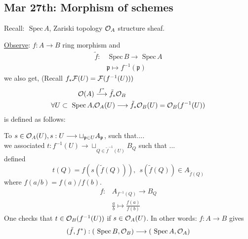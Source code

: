\documentclass[11pt]{article}
\theoremstyle{definition}
\newcommand{\spec}{\text{ Spec}\,}
\newcommand{\scp}{{\mathfrak p}}
\newcommand{\calf}{{\cal F}}
\newcommand{\calo}{{\cal O}}
\newcommand{\lrta}{\longrightarrow}
\begin{document}
\subsection{Mar 27th: Morphism of schemes}
Recall: $\spec A$, Zariski topology $\calo_A$ structure sheaf.

\underline{Observe}: 
$f:A\lrta B$ ring morphism and 
$$
\begin{aligned}
\tilde{f}:&\spec B\lrta \spec A\\
& \scp\longmapsto f^{-1}(\scp)
\end{aligned}
$$
we also get, (Recall $f_*\calf(U)=\calf(f^{-1}(U)))$
$$
\begin{aligned}
\calo(A) &\overset{f^*}{\lrta}  \tilde{f}_*\calo_B \\
\forall U\subset \spec A, &\calo_A(U)\lrta \tilde{f}_*\calo_B(U)=\calo_B(f^{-1}(U))
\end{aligned}
$$
is defined as follows:

To $s\in \calo_A(U), s:U\lrta \sqcup_{\scp\in U}A_\scp$, such that....\\
we associated $t:f^{-1}(U)\lrta \sqcup_{Q\in\tilde{f}^{-1}(U)}B_Q$  such that ...\\
defined 
$$
t(Q)=f(s(\tilde{f}(Q))), \ \ s(\tilde{f}(Q))\in A_{\tilde{f}(Q)}
$$
where $f(a/b)=f(a)/f(b)$.
$$\begin{aligned}
f:&A_{f^{-1}(Q)}\lrta B_Q\\
& \frac{a}{b}\longmapsto \frac{f(a)}{f(b)}
\end{aligned}
$$
One checks that $t\in\calo_B(f^{-1}(U))$ if $s\in \calo_A(U)$. In other words: $f:A\lrta B$ gives 
$$
(\tilde{f},f^*): (\spec B,\calo_B)\lrta (\spec A,\calo_A)
$$
\end{document}
